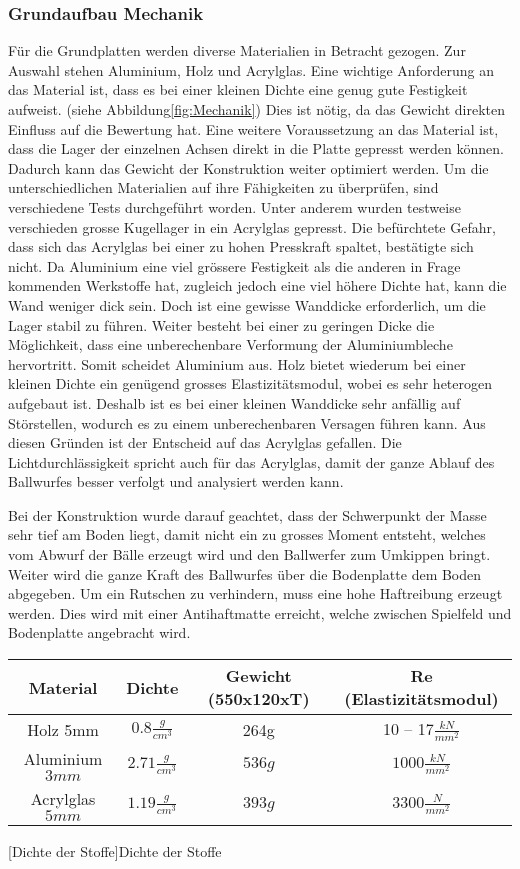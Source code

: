 \subsubsection{Grundaufbau Mechanik}
Für die Grundplatten werden diverse Materialien in Betracht gezogen. Zur Auswahl stehen Aluminium, Holz und Acrylglas. Eine wichtige Anforderung an das Material ist, dass es bei einer kleinen Dichte eine genug gute Festigkeit aufweist. (siehe Abbildung\ref{fig:Mechanik})
Dies ist nötig, da das Gewicht direkten Einfluss auf die Bewertung hat. Eine weitere Voraussetzung an das Material ist, dass die Lager der einzelnen Achsen direkt in die Platte gepresst werden können. Dadurch kann das Gewicht der Konstruktion weiter optimiert werden. Um die unterschiedlichen Materialien auf ihre Fähigkeiten zu überprüfen, sind verschiedene Tests durchgeführt worden. Unter anderem wurden testweise verschieden grosse Kugellager in ein Acrylglas gepresst. Die befürchtete Gefahr, dass sich das Acrylglas bei einer zu hohen Presskraft spaltet, bestätigte sich nicht. Da Aluminium eine viel grössere Festigkeit als die anderen in Frage kommenden Werkstoffe hat, zugleich jedoch eine viel höhere Dichte hat, kann die Wand weniger dick sein. Doch ist eine gewisse Wanddicke erforderlich, um die Lager stabil zu führen. Weiter besteht bei einer zu geringen Dicke die Möglichkeit, dass eine unberechenbare Verformung der Aluminiumbleche hervortritt. Somit scheidet Aluminium aus. Holz bietet wiederum bei einer kleinen Dichte ein genügend grosses Elastizitätsmodul, wobei es sehr heterogen aufgebaut ist. Deshalb ist es bei einer kleinen Wanddicke sehr anfällig auf Störstellen, wodurch es zu einem unberechenbaren Versagen führen kann. Aus diesen Gründen ist der Entscheid auf das Acrylglas gefallen. Die Lichtdurchlässigkeit spricht auch für das Acrylglas, damit der ganze Ablauf des Ballwurfes besser verfolgt und analysiert werden kann. 

Bei der Konstruktion wurde darauf geachtet, dass der Schwerpunkt der Masse sehr tief am Boden liegt, damit nicht ein zu grosses Moment entsteht, welches vom Abwurf der Bälle erzeugt wird und den Ballwerfer zum Umkippen bringt. Weiter wird die ganze Kraft des Ballwurfes über die Bodenplatte dem Boden abgegeben. Um ein Rutschen zu verhindern, muss eine hohe Haftreibung erzeugt werden. Dies wird mit einer Antihaftmatte erreicht, welche zwischen Spielfeld und Bodenplatte angebracht wird.
\begin{table}[h!]
	\begin{tabular}{|c|c|c|c|}
		\hline Material & Dichte & Gewicht (550x120xT) & Re (Elastizitätsmodul) \\ 
		\hline Holz 5mm & $0.8 \frac{g}{cm^3}$ & 264g & 10 – 17$\frac{kN}{mm^2}$ \\ 
		\hline Aluminium $3 mm$ & $2.71 \frac{g}{cm^3}$ & $536 g$ & $1000 \frac{kN}{mm^2}$ \\ 
		\hline Acrylglas $5 mm$ & $1.19 \frac{g}{cm^3}$ & $393 g$ & $3300 \frac{N}{mm^2}$  \\ 
		\hline 
	\end{tabular} 
	[Dichte der Stoffe]{Dichte der Stoffe \cite{beruf:Chemie}}
		\centering
\end{table}
 		
 			

